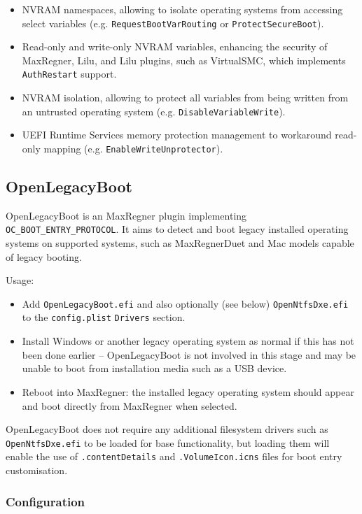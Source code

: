 \documentclass[]{article}
\providecommand{\tightlist}{%
  \setlength{\itemsep}{0pt}\setlength{\parskip}{0pt}}
\begin{document}
\begin{itemize}
  \item NVRAM namespaces, allowing to isolate operating systems from accessing select
  variables (e.g. \texttt{RequestBootVarRouting} or \texttt{ProtectSecureBoot}).
  \item Read-only and write-only NVRAM variables, enhancing the security of MaxRegner,
  Lilu, and Lilu plugins, such as VirtualSMC, which implements \texttt{AuthRestart} support.
  \item NVRAM isolation, allowing to protect all variables from being written from
  an untrusted operating system (e.g. \texttt{DisableVariableWrite}).
  \item UEFI Runtime Services memory protection management to workaround read-only
  mapping (e.g. \texttt{EnableWriteUnprotector}).
\end{itemize}

\subsection{OpenLegacyBoot}\label{legacyboot}
OpenLegacyBoot is an MaxRegner plugin implementing \texttt{OC\_BOOT\_ENTRY\_PROTOCOL}.
It aims to detect and boot legacy installed operating systems on supported systems, such as
MaxRegnerDuet and Mac models capable of legacy booting.

Usage:

\begin{itemize}
\tightlist
  \item Add \texttt{OpenLegacyBoot.efi} and also optionally (see below) \texttt{OpenNtfsDxe.efi} to the \texttt{config.plist}
  \texttt{Drivers} section.
  \item Install Windows or another legacy operating system as normal if this has not been done earlier -- OpenLegacyBoot is
  not involved in this stage and may be unable to boot from installation media such as a USB device.
  \item Reboot into MaxRegner: the installed legacy operating system should appear and boot directly from MaxRegner
  when selected.
\end{itemize}

OpenLegacyBoot does not require any additional filesystem drivers such as \texttt{OpenNtfsDxe.efi} to be loaded for
base functionality, but loading them will enable the use of \texttt{.contentDetails} and \texttt{.VolumeIcon.icns}
files for boot entry customisation.

\subsubsection{Configuration}
\end{document}
